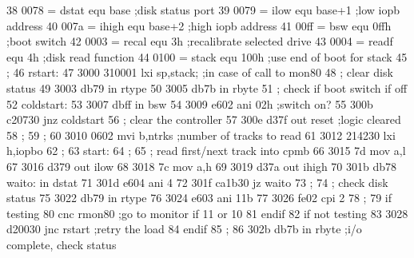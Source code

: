  38      0078 =           dstat    equ     base          ;disk status port
 39      0079 =           ilow     equ     base+1        ;low iopb address
 40      007a =           ihigh    equ     base+2        ;high iopb address
 41      00ff =           bsw      equ     0ffh          ;boot switch
 42      0003 =           recal    equ     3h            ;recalibrate selected drive
 43      0004 =           readf    equ     4h            ;disk read function
 44      0100 =           stack    equ     100h          ;use end of boot for stack
 45                       ;
 46                       rstart:
 47      3000 310001               lxi     sp,stack;     ;in case of call to mon80
 48                       ;        clear disk status
 49      3003 db79                 in      rtype
 50      3005 db7b                 in      rbyte
 51                       ;        check if boot switch if off
 52                       coldstart:
 53      3007 dbff                 in      bsw
 54      3009 e602                 ani     02h           ;switch on?
 55      300b c20730               jnz     coldstart
 56                       ;        clear the controller
 57      300e d37f                 out     reset         ;logic cleared
 58                       ;
 59                       ;
 60      3010 0602                 mvi     b,ntrks       ;number of tracks to read
 61      3012 214230               lxi     h,iopbo
 62                       ;
 63                       start:
 64                       ;
 65                       ;        read first/next track into cpmb
 66      3015 7d                   mov     a,l
 67      3016 d379                 out     ilow
 68      3018 7c                   mov     a,h
 69      3019 d37a                 out     ihigh
 70      301b db78        waito:   in      dstat
 71      301d e604                 ani     4
 72      301f ca1b30               jz      waito
 73                       ;
 74                       ;        check disk status
 75      3022 db79                 in      rtype
 76      3024 e603                 ani     11b
 77      3026 fe02                 cpi     2
 78                       ;
 79                                if      testing
 80                                cnc     rmon80    ;go to monitor if 11 or 10
 81                                endif
 82                                if      not testing
 83      3028 d20030               jnc     rstart    ;retry the load
 84                                endif
 85                       ;
 86      302b db7b                 in      rbyte     ;i/o complete, check status
